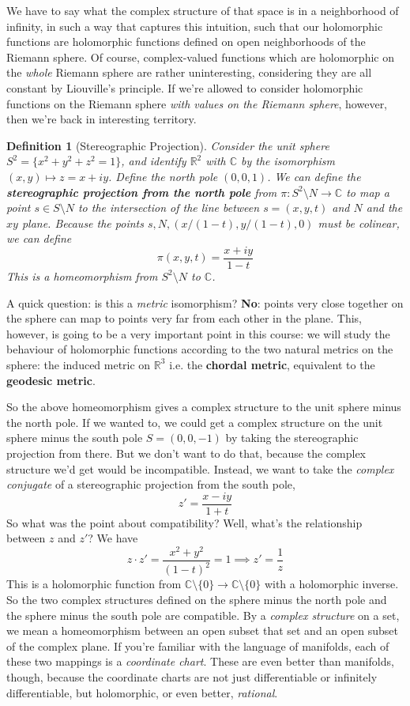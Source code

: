 \documentclass{article}
\newcommand{\mbb}[1]{\mathbb{#1}}
\newcommand{\reals}{\mbb{R}}
\newtheorem{definition}{Definition}
\begin{document}
We have to say what the complex structure of that space is in a neighborhood of infinity, in such a way that captures this intuition, such that our holomorphic functions are holomorphic functions defined on open neighborhoods of the Riemann sphere.
Of course, complex-valued functions which are holomorphic on the \textit{whole} Riemann sphere are rather uninteresting, considering they are all constant by Liouville's principle. If we're allowed to consider holomorphic functions on the Riemann sphere \textit{with values on the Riemann sphere}, however, then we're back in interesting territory.

\begin{definition}[Stereographic Projection]
Consider the unit sphere \(S^2 = \{x^2 + y^2 + z^2 = 1\}\), and identify \(\reals^2\) with \(\mbb{C}\) by the isomorphism \((x, y) \mapsto z = x + iy\). Define the north pole \((0, 0, 1)\). We can define the \textbf{stereographic projection from the north pole} from \(\pi: S^2 \setminus N \to \mbb{C}\) to map a point \(s \in S \setminus N\) to the intersection of the line between \(s = (x, y, t)\) and \(N\) and the \(xy\) plane. Because the points \(s, N, (x/(1 - t), y/(1 - t), 0)\) must be colinear, we can define
\[\pi(x, y, t) = \frac{x + iy}{1 - t}\]
This is a homeomorphism from \(S^2 \setminus N\) to \(\mbb{C}\).
\end{definition}
A quick question: is this a \textit{metric} isomorphism? \textbf{No}: points very close together on the sphere can map to points very far from each other in the plane. This, however, is going to be a very important point in this course: we will study the behaviour of holomorphic functions according to the two natural metrics on the sphere: the induced metric on \(\reals^3\) i.e. the \textbf{chordal metric}, equivalent to the \textbf{geodesic metric}.

So the above homeomorphism gives a complex structure to the unit sphere minus the north pole. If we wanted to, we could get a complex structure on the unit sphere minus the south pole \(S = (0, 0, -1)\) by taking the stereographic projection from there. But we don't want to do that, because the complex structure we'd get would be incompatible. Instead, we want to take the \textit{complex conjugate} of a stereographic projection from the south pole,
\[z' = \frac{x - iy}{1 + t}\]
So what was the point about compatibility? Well, what's the relationship between \(z\) and \(z'\)? We have
\[z \cdot z' = \frac{x^2 + y^2}{(1 - t)^2} = 1 \implies z' = \frac{1}{z}\]
This is a holomorphic function from \(\mbb{C} \setminus \{0\} \to \mbb{C} \setminus \{0\}\) with a holomorphic inverse. So the two complex structures defined on the sphere minus the north pole and the sphere minus the south pole are compatible. By a \textit{complex structure} on a set, we mean a homeomorphism between an open subset that set and an open subset of the complex plane. If you're familiar with the language of manifolds, each of these two mappings is a \textit{coordinate chart}. These are even better than manifolds, though, because the coordinate charts are not just differentiable or infinitely differentiable, but holomorphic, or even better, \textit{rational}.
\end{document}

